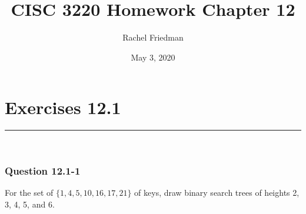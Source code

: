 \documentclass[11pt]{article}
\title{CISC 3220 Homework Chapter 12}
\author{Rachel Friedman}
\date{May 3, 2020}
\begin{document}
\maketitle

\section*{Exercises 12.1}\nointerlineskip
\noindent \rule{\linewidth}{0.01pt}\\

\subsubsection*{Question 12.1-1}\nointerlineskip
For the set of $\{ 1, 4, 5, 10, 16, 17, 21 \}$  of keys, draw binary search trees of heights 2, 3, 4, 5, and 6.\\
\end{document}
